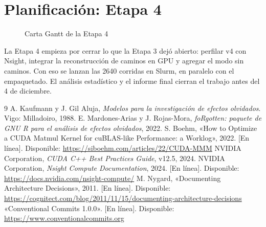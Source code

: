 \documentclass[11pt,a4paper]{article}
\begin{document}
\section{Planificación: Etapa 4}\label{sec:plan}
\begin{figure}[h]
\centering
{}
\caption{Carta Gantt de la Etapa 4}\label{fig:gantt}
\end{figure}

La Etapa 4 empieza por cerrar lo que la Etapa 3 dejó abierto: perfilar v4 con Nsight, integrar la
reconstrucción de caminos en GPU y agregar el modo sin caminos. Con eso se
lanzan las \num{2640} corridas en Slurm, en paralelo con el empaquetado. El análisis
estadístico y el informe final cierran el trabajo antes del 4 de diciembre.

\begin{thebibliography}{9}
 A. Kaufmann y J. Gil Aluja, \emph{Modelos para la investigación de efectos
  olvidados}. Vigo: Milladoiro, 1988.
 E. Mardones-Arias y J. Rojas-Mora, \emph{foRgotten: paquete de GNU R para
  el análisis de efectos olvidados}, 2022.
 S. Boehm, «How to Optimize a CUDA Matmul Kernel for cuBLAS-like Performance:
  a Worklog», 2022. [En línea]. Disponible: \url{https://siboehm.com/articles/22/CUDA-MMM}
 NVIDIA Corporation, \emph{CUDA C++ Best Practices Guide}, v12.5, 2024.
 NVIDIA Corporation, \emph{Nsight Compute Documentation}, 2024. [En línea].
  Disponible: \url{https://docs.nvidia.com/nsight-compute/}
 M. Nygard, «Documenting Architecture Decisions», 2011. [En línea].
  Disponible: \url{https://cognitect.com/blog/2011/11/15/documenting-architecture-decisions}
 «Conventional Commits 1.0.0». [En línea]. Disponible:
  \url{https://www.conventionalcommits.org}
\end{thebibliography}
\end{document}
